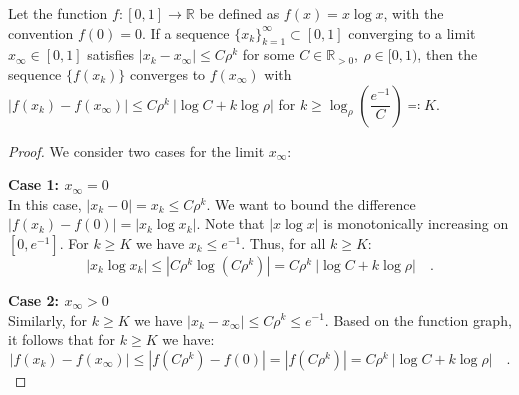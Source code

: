 \documentclass[../../main.tex]{subfiles}
\begin{document}
\begin{lemma}
\label{lemma:xlogx_exponential_convergence}
Let the function $f: [0, 1] \to \mathbb{R}$ be defined as $f(x) = x \log x$, with the convention $f(0) = 0$. If a sequence $\{x_k\}_{k=1}^\infty \subset [0,1]$ converging to a limit $x_\infty \in [0,1]$ satisfies $|x_k - x_\infty| \leq C \rho^k$ for some $C \in \mathbb{R}_{>0}, \ \rho \in [0, 1)$, then the sequence $\{f(x_k)\}$ converges to $f(x_\infty)$ with $|f(x_k) - f(x_\infty)| \leq C \rho^k \ |\log C + k \log \rho|$ for $k \geq \log_\rho \left( \dfrac{e^{-1}}{C} \right) \eqqcolon K$.
\end{lemma}
\vspace{-2.5em}
\begin{proof}
We consider two cases for the limit $x_\infty$:

\textbf{Case 1: $x_\infty = 0$} \\
In this case, $|x_k - 0| = x_k \le C \rho^k$. We want to bound the difference $|f(x_k) - f(0)| = |x_k \log x_k|$.
Note that $|x \log x|$ is monotonically increasing on $[0, e^{-1}]$. For $k \geq K$ we have $x_k \leq e^{-1}$. Thus, for all $k \geq K$:
\[
    |x_k \log x_k| \leq |C \rho^k \log (C \rho^k)| = C \rho^k \ |\log C + k \log \rho| \quad .
\]

\textbf{Case 2: $x_\infty > 0$} \\
Similarly, for $k \geq K$ we have $|x_k - x_\infty| \leq C \rho^k \leq e^{-1}$. Based on the function graph, it follows that for $k \geq K$ we have:
\[
    |f(x_k) - f(x_\infty)| \leq |f(C \rho^k) - f(0)| = |f(C \rho^k)| = C \rho^k \ |\log C + k \log \rho| \quad .
\]
\end{proof}
\end{document}
